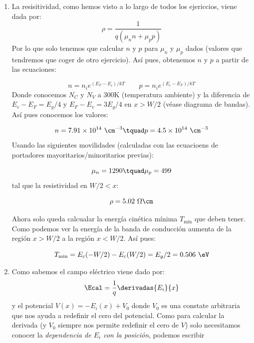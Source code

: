 	
	\begin{enumerate}[label=\alph*)]
		\item La resisitividad, como hemos visto a lo largo de todos los ejericcios, viene dada por:
		\begin{equation}
			\rho = \frac{1}{q(\mu_n n + \mu_p p)}
		\end{equation}
		Por lo que solo tenemos que calcular $n$ y $p$ para $\mu_n$ y $\mu_p$ dados (valores que tendremos que coger de otro ejercicio). Así pues, obtenemos $n$ y $p$ a partir de las ecuaciones:

		\begin{equation}
			n = n_i e^{(E_F-E_i)/kT} \qquad p = n_i e^{(E_i-E_F)/kT}
		\end{equation}
		Donde conocemos $N_C$ y $N_V$ a 300K (temperatura ambiente) y la diferencia de $E_c-E_F=E_g/4$ y $E_F-E_v=3E_g/4$ en $x>W/2$ (véase diagrama de bandas). Así pues conocemos los valores:

		\begin{equation}
			n= 7.91\times 10^{14} \ \cm^{-3} \tquad p = 4.5\times 10^{14} \ \cm^{-3}
		\end{equation}
		Usando las siguientes movilidades (calculadas con las ecuacioens de portadores mayoritarios/minoritarios previas):
		
		\begin{equation}
			\mu_n = 1290 \tquad \mu_p = 499
		\end{equation}
		tal que la resistividad en $W/2<x$:

		\begin{equation}
			\rho = 5.02 \ \Omega \cm
		\end{equation}

		Ahora solo queda calcualar la energía cinética mínima $T_{\min}$ que deben tener. Como podemos ver la energía de la banda de conducción aumenta de la región $x>W/2$ a la región $x<W/2$. Así pues:

		\begin{equation}
			T_{\min} = E_c(-W/2) - E_c(W/2) = E_g/2 = 0.506 \	 \eV
		\end{equation}
		\item Como sabemos el campo eléctrico viene dado por:
		\begin{equation}
			\Ecal = \frac{1}{q} \derivadas{E_i}{x}
		\end{equation}
		y el potencial $V(x)=-E_i(x)+V_0$ donde $V_0$ es una constate arbitraria que nos ayuda a redefinir el cero del potencial. Como para calcular la derivada (y $V_0$ siempre nos permite redefinir el cero de $V$) solo necesitamos conocer la \textit{dependencia de $E_i$ con la posición}, podemos escribir


\end{enumerate}
